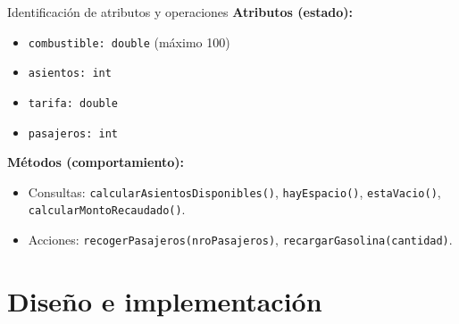 \documentclass[aspectratio=169]{beamer}
\begin{document}
\begin{frame}{Identificación de atributos y operaciones}
  \textbf{Atributos (estado):}
  \begin{itemize}
    \item \texttt{combustible: double} (máximo 100)
    \item \texttt{asientos: int}
    \item \texttt{tarifa: double}
    \item \texttt{pasajeros: int}
  \end{itemize}
  \vspace{6pt}
  \textbf{Métodos (comportamiento):}
  \begin{itemize}
    \item Consultas: \texttt{calcularAsientosDisponibles()}, \texttt{hayEspacio()}, \texttt{estaVacio()}, \texttt{calcularMontoRecaudado()}.
    \item Acciones: \texttt{recogerPasajeros(nroPasajeros)}, \texttt{recargarGasolina(cantidad)}.
  \end{itemize}
\end{frame}

\section{Diseño e implementación}
\end{document}
